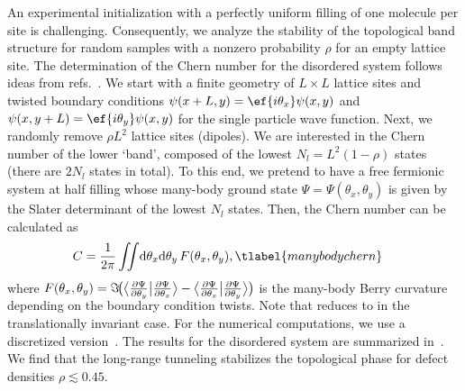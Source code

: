 An experimental initialization with a perfectly uniform filling of one molecule per site is challenging.
Consequently, we analyze the stability of the topological band structure for random samples with a nonzero probability $\rho$ for an empty lattice site.
The determination of the Chern number for the disordered system follows ideas from refs.~\cite{Niu1985,Avron1985}.
We start with a finite geometry of $L \times L$ lattice sites and twisted boundary conditions
$\psi(x + L, y) = \ef{i\theta_x}\psi(x, y)$ and $\psi(x, y + L) = \ef{i\theta_y}\psi(x, y)$ for the single particle wave function.
Next, we randomly remove $\rho L^2$ lattice sites (dipoles).
We are interested in the Chern number of the lower `band', composed of the lowest $N_l=L^2 (1-\rho)$ states (there are $2N_l$ states in total).
To this end, we pretend to have a free fermionic system at half filling whose many-body ground state $\Psi=\Psi(\theta_x, \theta_y)$ is given by the Slater determinant of the lowest $N_l$ states.
Then, the Chern number can be calculated as
\begin{align}
    C &= \frac{1}{2\pi}\iint\!\mathrm{d}\theta_x \mathrm{d}\theta_y \, F(\theta_x, \theta_y), \tlabel{manybodychern}
\end{align}
where $F(\theta_x,\theta_y)=\smash{\Im\!\big({\big\langle\frac{\partial \Psi}{\partial \theta_y}\big|\frac{\partial \Psi}{\partial \theta_x}\big\rangle - \big\langle\frac{\partial \Psi}{\partial \theta_x}\big|\frac{\partial \Psi}{\partial \theta_y}\big\rangle}\big)}$ is the many-body Berry curvature depending on the boundary condition twists.
Note that  reduces to  in the translationally invariant case.
For the numerical computations, we use a discretized version~\cite{Fukui2005}.
The results for the disordered system are summarized in~.
We find that the long-range tunneling stabilizes the topological phase for defect densities $\rho\lesssim 0.45$.

